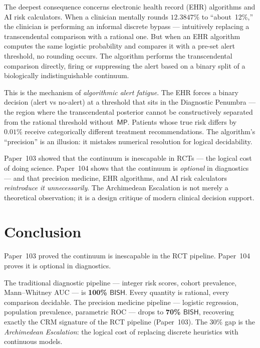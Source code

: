 \documentclass[11pt,a4paper]{article}
\theoremstyle{plain}
\theoremstyle{definition}
\newcommand{\BISH}{\textsf{BISH}}
\newcommand{\MP}{\textsf{MP}}
\begin{document}
The deepest consequence concerns electronic health record (EHR) algorithms and AI risk calculators.  When a clinician mentally rounds $12.3847\%$ to ``about~12\%,'' the clinician is performing an informal discrete bypass --- intuitively replacing a transcendental comparison with a rational one.  But when an EHR algorithm computes the same logistic probability and compares it with a pre-set alert threshold, no rounding occurs.  The algorithm performs the transcendental comparison directly, firing or suppressing the alert based on a binary split of a biologically indistinguishable continuum.

This is the mechanism of \emph{algorithmic alert fatigue}.  The EHR forces a binary decision (alert vs no-alert) at a threshold that sits in the Diagnostic Penumbra --- the region where the transcendental posterior cannot be constructively separated from the rational threshold without~$\MP$.  Patients whose true risk differs by $0.01\%$ receive categorically different treatment recommendations.  The algorithm's ``precision'' is an illusion: it mistakes numerical resolution for logical decidability.

Paper~103 showed that the continuum is inescapable in RCTs --- the logical cost of doing science.  Paper~104 shows that the continuum is \emph{optional} in diagnostics --- and that precision medicine, EHR algorithms, and AI risk calculators \emph{reintroduce it unnecessarily}.  The Archimedean Escalation is not merely a theoretical observation; it is a design critique of modern clinical decision support.

\section{Conclusion}\label{sec:conclusion}

Paper~103 proved the continuum is inescapable in the RCT pipeline.  Paper~104 proves it is optional in diagnostics.

The traditional diagnostic pipeline --- integer risk scores, cohort prevalence, Mann--Whitney AUC --- is \textbf{100\% $\BISH$}.  Every quantity is rational, every comparison decidable.  The precision medicine pipeline --- logistic regression, population prevalence, parametric ROC --- drops to \textbf{70\% $\BISH$}, recovering exactly the CRM signature of the RCT pipeline (Paper~103).  The 30\% gap is the \emph{Archimedean Escalation}: the logical cost of replacing discrete heuristics with continuous models.
\end{document}
